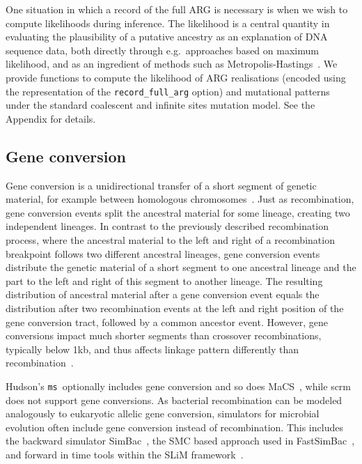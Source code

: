 \documentclass{article}
\newcommand{\ms}[0]{\texttt{ms}}
\begin{document}
One situation in which a record of the full ARG is necessary is when we
wish to compute likelihoods during inference.
The likelihood is a central quantity in evaluating the plausibility of a putative
ancestry as an explanation of DNA sequence data, both directly through
e.g.~approaches based on maximum likelihood, and as an ingredient of
methods such as
Metropolis-Hastings~\citep{kuhner2000maximum,nielsen2000estimation,wang2008bayesian}.
We provide functions to compute the likelihood of ARG realisations
(encoded using the representation of the \texttt{record\_full\_arg} option)
and mutational patterns under
the standard coalescent and infinite sites mutation model.
See the Appendix for details.

\subsection{Gene conversion}

Gene conversion is a unidirectional transfer of a short segment of genetic material,
for example between homologous chromosomes~\citep{Chen2007}.
Just as recombination, gene conversion events split the ancestral material
for some lineage, creating two independent lineages.
In contrast to the previously described recombination process, where the ancestral
material to the left and right of a recombination breakpoint follows two
different ancestral lineages, gene conversion events distribute the genetic material
of a short segment to one ancestral lineage and the part to the left and right of this
segment to another lineage.
The resulting distribution of ancestral material after a gene conversion event
equals the distribution after two recombination events at the left and right position
of the gene conversion tract, followed by a common ancestor event.
However, gene conversions impact much shorter segments than crossover recombinations,
typically below 1kb, and thus affects linkage pattern differently than
recombination~\citep{Korunes2017}.

Hudson's \ms\ optionally includes gene conversion and so does
MaCS~\citep{chen2009fast}, while scrm~\citep{staab2014scrm} does not
support gene conversions.
As bacterial recombination can be modeled analogously to eukaryotic allelic
gene conversion, simulators for microbial evolution often include gene conversion
instead of recombination.
This includes the backward simulator SimBac~\citep{brown2016simbac},
the SMC based approach used in FastSimBac~\citep{DeMaio2017},
and forward in time tools within the SLiM framework~\citep{Cury2020}.
\end{document}
